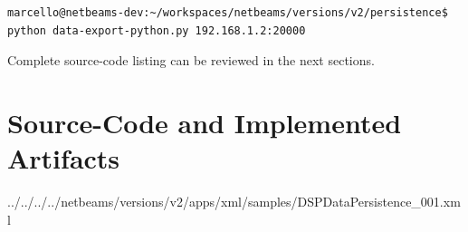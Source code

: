 \lstset{label=cmd:mongo-python-export,caption=Query Element with specific
projection limiting the result set size}
\begin{lstlisting}
marcello@netbeams-dev:~/workspaces/netbeams/versions/v2/persistence$ python data-export-python.py 192.168.1.2:20000
\end{lstlisting}

Complete source-code listing can be reviewed in the next sections.

\newpage

\section{Source-Code and Implemented Artifacts}












{../../../../netbeams/versions/v2/apps/xml/samples/DSPDataPersistence_001.xml}





